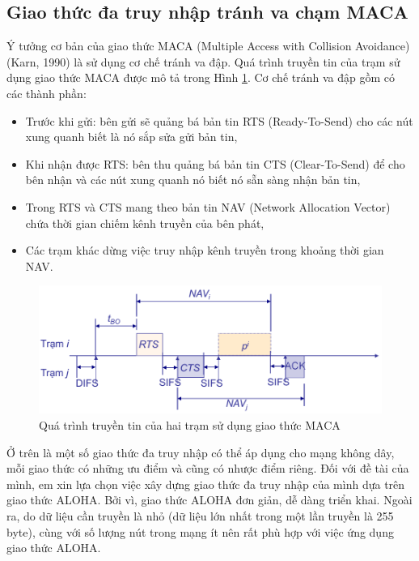\subsection{Giao thức đa truy nhập tránh va chạm MACA}
Ý tưởng cơ bản của giao thức MACA \cite{6} (Multiple Access with Collision Avoidance) (Karn, 1990) là sử dụng cơ chế tránh va đập. Quá trình truyền tin của trạm sử dụng giao thức MACA được mô tả trong Hình \ref{MACA}{}. Cơ chế tránh va đập gồm có các thành phần:
\begin{itemize}
\item Trước khi gửi: bên gửi sẽ quảng bá bản tin RTS (Ready-To-Send) cho các nút xung quanh biết là nó sắp sửa gửi bản tin,
\item Khi nhận được RTS: bên thu quảng bá bản tin CTS (Clear-To-Send) để cho bên nhận và các nút xung quanh nó biết nó sẵn sàng nhận bản tin,
\item Trong RTS và CTS mang theo bản tin NAV (Network Allocation Vector) chứa thời gian chiếm kênh truyền của bên phát,
\item Các trạm khác dừng việc truy nhập kênh truyền trong khoảng thời gian NAV.
\end{itemize}
\begin{figure}[h]
\begin{center}
\includegraphics[scale=0.4]{image/MACA}
\end{center}
\caption{Quá trình truyền tin của hai trạm sử dụng giao thức MACA}
\label{MACA}
\end{figure}
Ở trên là một số giao thức đa truy nhập có thể áp dụng cho mạng không dây, mỗi giao thức có những ưu điểm và cũng có nhược điểm riêng. Đối với đề tài của mình, em xin lựa chọn việc xây dựng giao thức đa truy nhập của mình dựa trên giao thức ALOHA. Bởi vì, giao thức ALOHA đơn giản, dễ dàng triển khai. Ngoài ra, do dữ liệu cần truyền là nhỏ (dữ liệu lớn nhất trong một lần truyền là 255 byte), cùng với số lượng nút trong mạng ít nên rất phù hợp với việc ứng dụng giao thức ALOHA.
